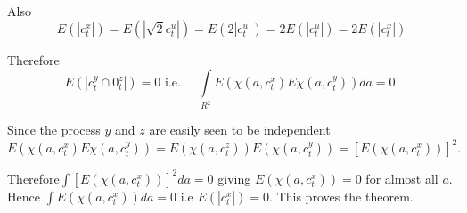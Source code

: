 \begin{pot*}
  Also
  $$
  E(|c^x_t|)=E(|\sqrt{2}c^u_t|)=E(2|c^u_t|)=2E(|c^u_t|)=2E(|c^x_t|)
  $$

  Therefore
  $$
  E(|c^y_t \cap 0^z_t|)=0\text{\  i.e.\ } \quad \int \limits_{R^2}E
  (\chi(a,c^x_t)E \chi(a,c^y_t))da=0. 
  $$

  Since the process $y$ and $z$ are easily seen to be independent
  $$
  E (\chi(a,c^x_t)E \chi(a,c^y_t))=E (\chi(a,c^z_t))E
  (\chi(a,c^y_t))=[E (\chi(a,c^x_t))]^2. 
  $$

  Therefore\pageoriginale $\int [E (\chi(a,c^x_t))]^2 da=0$ giving $E 
  (\chi(a,c^x_t))=0$ for almost all $a$. Hence $\int E
  (\chi(a,c^x_t))da=0$ i.e $E(|c^x_t|)=0$. This proves the theorem. 
\end{pot*} 
